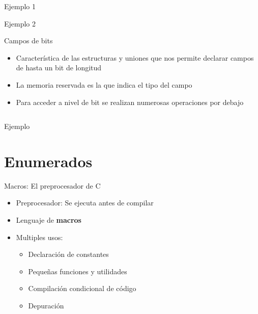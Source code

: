 \documentclass{mybeamer}
\begin{document}
\begin{framesubsec}{Ejemplo 1}
	
\end{framesubsec}

\begin{framesubsec}{Ejemplo 2}
	\setlength\columnsep{1cm}
	\begin{multicols}{2}
		
	\end{multicols}
\end{framesubsec}

\begin{framesec}{Campos de bits}
	\begin{itemize}
		\item Característica de las estructuras y uniones que nos
			permite declarar campos de hasta un bit de longitud
		\item La memoria reservada es la que indica el tipo del campo
		\item Para acceder a nivel de bit se realizan numerosas
			operaciones por debajo
	\end{itemize}
	\vspace{2em}
	\begin{columns}[onlytextwidth]
		
	\end{columns}
\end{framesec}

\begin{framesubsec}{Ejemplo}
	
\end{framesubsec}

\section{Enumerados}
\begin{framesubsec}[Macros]{Macros: El preprocesador de C}
	\begin{itemize}
		\item Preprocesador: Se ejecuta antes de compilar
		\item Lenguaje de \textbf{macros}
		\item Multiples usos:
		\begin{itemize}
			\item Declaración de constantes
			\item Pequeñas funciones y utilidades
			\item Compilación condicional de código
			\item Depuración
		\end{itemize}
	\end{itemize}
\end{framesubsec}
\end{document}
